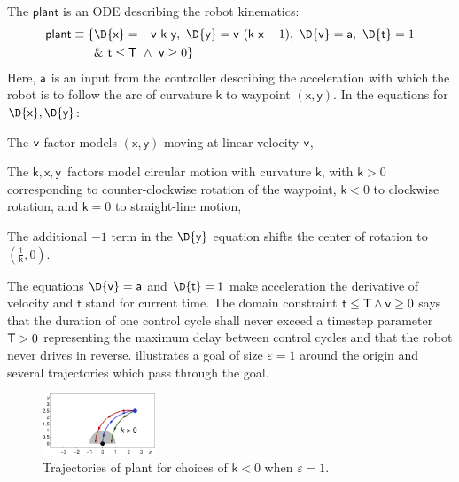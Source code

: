 \documentclass[12pt]{cmuthesis}
\theoremstyle{definition}
\theoremstyle{remark}
\newcommand{\xgvar}{\textsf{x}}
\newcommand{\ygvar}{\textsf{y}}
\newcommand{\kvar}{\textsf{k}}
\newcommand{\tvar}{\textsf{t}}
\newcommand{\Tvar}{{\sf T}\xspace}
\newcommand{\vvar}{{\sf v}\xspace}
\newcommand{\avar}{{\sf a}\xspace}
\newcommand{\plant}{\textsf{plant}\xspace}
\newcommand{\rref}[2][]{\prettyref{#2}}
\begin{document}
The $\plant$ is an ODE describing the robot kinematics:
\begin{align*}
\plant\equiv \{&\D{\xgvar}=-\vvar~\kvar~\ygvar,~\D{\ygvar}=\vvar~(\kvar~\xgvar-1),~\D{\vvar}=\avar,~\D{\tvar}=1 \\
 &\&~\tvar\leq \Tvar ~\land~ \vvar \geq 0\} %
\end{align*}
Here, $\avar$ is an input from the controller describing the acceleration with which the robot is to follow the arc of curvature $\kvar$ to waypoint $(\xgvar,\ygvar)$.
In the equations for $\D{\xgvar},\D{\ygvar}$: \begin{inparaenum}[\it i)]\item The $\vvar$ factor models $(\xgvar,\ygvar)$ moving at linear velocity $\vvar$, \item The $\kvar,\xgvar,\ygvar$\ factors model circular motion with curvature $\kvar$, with $\kvar > 0$ corresponding to counter-clockwise rotation of the waypoint, $\kvar < 0$ to clockwise rotation, and $\kvar = 0$ to straight-line motion, \item The additional $-1$ term in the $\D{\ygvar}$ equation shifts the center of rotation to $\left(\frac{1}{\kvar},0\right)$.
\end{inparaenum}
The equations $\D{\vvar}=\avar$ and $\D{\tvar}=1$ make acceleration the derivative of velocity and $\tvar$ stand for current time.
The domain constraint $\tvar \leq \Tvar \land \vvar \geq 0$ says that the duration of one control cycle shall never exceed a timestep parameter $\Tvar > 0$ representing the maximum delay between control cycles and that the robot never drives in reverse.
\rref{fig:ode2} illustrates a goal of size $\varepsilon=1$ around the origin and several trajectories which pass through the goal.

\begin{figure}[h!t]
\centering
\includegraphics[width=0.3\textwidth]{graphics/fig-ode2.pdf}
\caption{Trajectories of \plant for choices of $\kvar < 0$ when $\varepsilon = 1$.}
\label{fig:ode2}
\end{figure}
\end{document}
